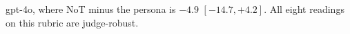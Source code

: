 gpt-4o, where NoT minus the persona is $-4.9$ $[-14.7, +4.2]$.
All eight readings on this rubric are judge-robust.

